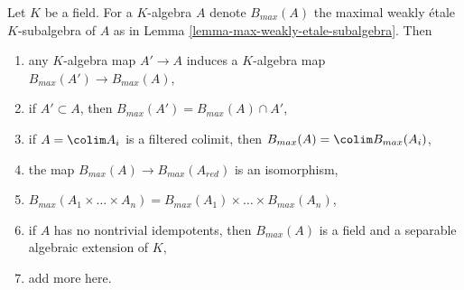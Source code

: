 \begin{lemma}
\label{lemma-properties-of-max-weakly-etale-subalgebra}
Let $K$ be a field. For a $K$-algebra $A$ denote $B_{max}(A)$
the maximal weakly \'etale $K$-subalgebra of $A$ as in
Lemma \ref{lemma-max-weakly-etale-subalgebra}. Then
\begin{enumerate}
\item any $K$-algebra map $A' \to A$ induces a $K$-algebra map
$B_{max}(A') \to B_{max}(A)$,
\item if $A' \subset A$, then $B_{max}(A') = B_{max}(A) \cap A'$,
\item if $A = \colim A_i$ is a filtered colimit, then
$B_{max}(A) = \colim B_{max}(A_i)$,
\item the map $B_{max}(A) \to B_{max}(A_{red})$ is an isomorphism,
\item $B_{max}(A_1 \times \ldots \times A_n) =
B_{max}(A_1) \times \ldots \times B_{max}(A_n)$,
\item if $A$ has no nontrivial idempotents, then $B_{max}(A)$ is a
field and a separable algebraic extension of $K$,
\item add more here.
\end{enumerate}
\end{lemma}

